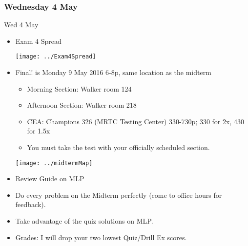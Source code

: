 \documentclass[cal1spr16Lectures.tex]{subfiles}
\begin{document}

\subsubsection{\bf Wednesday 4 May}

\begin{frame}[allowframebreaks]{Wed 4 May}
\begin{itemize}\small
\item Exam 4 Spread

\begin{center}
\texttt{[image: ../Exam4Spread]}
\end{center}

\framebreak
\item Final! is Monday 9 May 2016 6-8p, same location as the midterm
\begin{itemize}\footnotesize
	\item Morning Section: Walker room 124
	\item Afternoon Section: Walker room 218
	\item CEA: Champions 326 (MRTC Testing Center) 330-730p; 330 for 2x, 430 for 1.5x
	\item You \alert{must} take the test with your officially scheduled section.
\end{itemize}

\begin{center}
\texttt{[image: ../midtermMap]}
\end{center}

\framebreak
\item Review Guide on MLP
\item Do every problem on the Midterm perfectly (come to office hours for feedback).
\item Take advantage of the quiz solutions on MLP.
\item Grades: I will drop your two lowest Quiz/Drill Ex scores.  
\end{itemize}
\end{frame}


\end{document}

